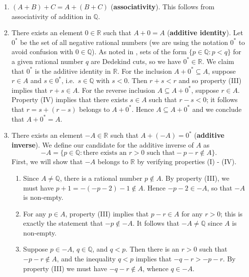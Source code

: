 \documentclass[12pt]{article}
\theoremstyle{definition}
\begin{document}
\begin{enumerate}[label = (A\arabic*)]
    \item \( (A + B) + C = A + (B + C) \) (\textbf{associativity}). This follows from associativity of addition in \( \mathbb{Q} \).
    
    \item There exists an element \( 0 \in \mathbb{R} \) such that \( A + 0 = A \) (\textbf{additive identity}). Let \( 0^* \) be the set of all negative rational numbers (we are using the notation \( 0^* \) to avoid confusion with \( 0 \in \mathbb{Q} \)). As noted in , sets of the form \( \{ p \in \mathbb{Q} : p < q \} \) for a given rational number \( q \) are Dedekind cuts, so we have \( 0^* \in \mathbb{R} \). We claim that \( 0^* \) is the additive identity in \( \mathbb{R} \). For the inclusion \( A + 0^* \subseteq A \), suppose \( r \in A \) and \( s \in 0^* \), i.e.\ \( s \in \mathbb{Q} \) with \( s < 0 \). Then \( r + s < r \) and so property (III) implies that \( r + s \in A \). For the reverse inclusion \( A \subseteq A + 0^* \), suppose \( r \in A \). Property (IV) implies that there exists \( s \in A \) such that \( r - s < 0 \); it follows that \( r = s + (r - s) \) belongs to \( A + 0^* \). Hence \( A \subseteq A + 0^* \) and we conclude that \( A + 0^* = A \).
    
    \item There exists an element \( -A \in \mathbb{R} \) such that \( A + (-A) = 0^* \) (\textbf{additive inverse}). We define our candidate for the additive inverse of \( A \) as
    \[
        -A = \{ p \in \mathbb{Q} : \text{there exists an } r > 0 \text{ such that} -p - r \not\in A \}.
    \]
    First, we will show that \( -A \) belongs to \( \mathbb{R} \) by verifying properties (I) - (IV).

    \begin{enumerate}[label = (\Roman*)]
        \item Since \( A \neq \mathbb{Q} \), there is a rational number \( p \not\in A \). By property (III), we must have \( p + 1 = -(-p - 2) - 1 \not\in A \). Hence \( -p - 2 \in -A \), so that \( -A \) is non-empty.
        
        \item For any \( p \in A \), property (III) implies that \( p - r \in A \) for any \( r > 0 \); this is exactly the statement that \( -p \not\in -A \). It follows that \( -A \neq \mathbb{Q} \) since \( A \) is non-empty.
        
        \item Suppose \( p \in -A \), \( q \in \mathbb{Q} \), and \( q < p \). Then there is an \( r > 0 \) such that \( -p - r \not\in A \), and the inequality \( q < p \) implies that \( -q - r > -p - r \). By property (III) we must have \( -q - r \not\in A \), whence \( q \in -A \).
        

\end{enumerate}
\end{enumerate}
\end{document}
